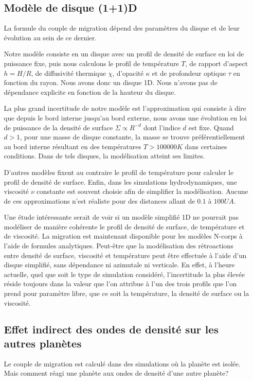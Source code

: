 \subsection{Modèle de disque (1+1)D}
La formule du couple de migration dépend des paramètres du disque et de leur évolution au sein de ce dernier. 

Notre modèle consiste en un disque avec un profil de densité de surface en loi de puissance fixe, puis nous calculons le profil de température $T$, de rapport d'aspect $h=H/R$, de diffusivité thermique $\chi$, d'opacité $\kappa$ et de profondeur optique $\tau$ en fonction du rayon. Nous avons donc un disque 1D. Nous n'avons pas de dépendance explicite en fonction de la hauteur du disque. 

La plus grand incertitude de notre modèle est l'approximation qui consiste à dire que depuis le bord interne jusqu'au bord externe, nous avons une évolution en loi de puissance de la densité de surface $\Sigma\propto R^{-d}$ dont l'indice $d$ est fixe. Quand $d>1$, pour une masse de disque constante, la masse se trouve préférentiellement au bord interne résultant en des températures $T>100 000\unit{K}$ dans certaines conditions. Dans de tels disques, la modélisation atteint ses limites.

D'autres modèles fixent au contraire le profil de température pour calculer le profil de densité de surface. Enfin, dans les simulations hydrodynamiques, une viscosité $\nu$ constante est souvent choisie afin de simplifier la modélisation. Aucune de ces approximations n'est réaliste pour des distances allant de $0.1$ à $100\unit{UA}$. 

Une étude intéressante serait de voir si un modèle simplifié 1D ne pourrait pas modéliser de manière cohérente le profil de densité de surface, de température et de viscosité. La migration est maintenant disponible pour les modèles N-corps à l'aide de formules analytiques. Peut-être que la modélisation des rétroactions entre densité de surface, viscosité et température peut être effectuée à l'aide d'un disque simplifié, sans dépendance ni azimutale ni verticale. En effet, à l'heure actuelle, quel que soit le type de simulation considéré, l'incertitude la plus élevée réside toujours dans la valeur que l'on attribue à l'un des trois profils que l'on prend pour paramètre libre, que ce soit la température, la densité de surface ou la viscosité.

\subsection{Effet indirect des ondes de densité sur les autres planètes}
Le couple de migration est calculé dans des simulations où la planète est isolée. Mais comment réagi une planète aux ondes de densité d'une autre planète? 

